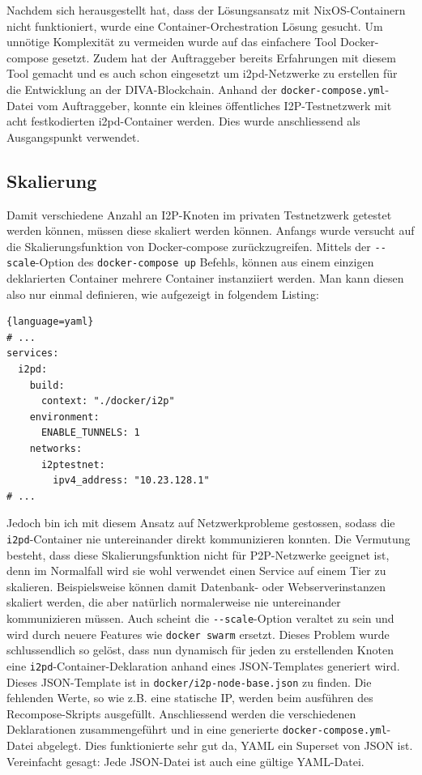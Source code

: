 Nachdem sich herausgestellt hat, dass der Lösungsansatz mit NixOS-Containern nicht funktioniert, wurde eine Container-Orchestration Lösung gesucht.
Um unnötige Komplexität zu vermeiden wurde auf das einfachere Tool Docker-compose gesetzt.
Zudem hat der Auftraggeber bereits Erfahrungen mit diesem Tool gemacht und es auch schon eingesetzt um i2pd-Netzwerke zu erstellen
für die Entwicklung an der DIVA-Blockchain.
Anhand der \lstinline|docker-compose.yml|-Datei vom Auftraggeber,
konnte ein kleines öffentliches I2P-Testnetzwerk mit acht festkodierten i2pd-Container werden.
Dies wurde anschliessend als Ausgangspunkt verwendet.

\subsection{Skalierung}\label{sec:scaling}

Damit verschiedene Anzahl an I2P-Knoten im privaten Testnetzwerk getestet werden können, müssen diese skaliert werden können.
Anfangs wurde versucht auf die Skalierungsfunktion von Docker-compose zurückzugreifen.
Mittels der \lstinline|--scale|-Option des \lstinline|docker-compose up| Befehls, können aus einem einzigen deklarierten Container mehrere Container instanziiert werden. Man kann diesen also nur einmal definieren, wie aufgezeigt in folgendem Listing:
\begin{lstlisting}{language=yaml}
# ... 
services:
  i2pd:
    build:
      context: "./docker/i2p"
    environment:
      ENABLE_TUNNELS: 1
    networks:
      i2ptestnet:
        ipv4_address: "10.23.128.1"
# ...  
\end{lstlisting}

Jedoch bin ich mit diesem Ansatz auf Netzwerkprobleme gestossen,
sodass die \lstinline|i2pd|-Container nie untereinander direkt kommunizieren konnten.
Die Vermutung besteht, dass diese Skalierungsfunktion nicht für P2P-Netzwerke geeignet ist,
denn im Normalfall wird sie wohl verwendet einen Service auf einem Tier zu skalieren.
Beispielsweise können damit Datenbank- oder Webserverinstanzen skaliert werden, die aber natürlich normalerweise nie untereinander kommunizieren müssen.
Auch scheint die \lstinline|--scale|-Option veraltet zu sein und wird durch neuere Features wie \lstinline|docker swarm| ersetzt.
Dieses Problem wurde schlussendlich so gelöst,
dass nun dynamisch für jeden zu erstellenden Knoten eine \lstinline|i2pd|-Container-Deklaration anhand eines JSON-Templates generiert wird.
Dieses JSON-Template ist in \lstinline|docker/i2p-node-base.json| zu finden.
Die fehlenden Werte, so wie z.B. eine statische IP, werden beim ausführen des Recompose-Skripts ausgefüllt.
Anschliessend werden die verschiedenen Deklarationen zusammengeführt und in eine generierte \lstinline|docker-compose.yml|-Datei abgelegt.
Dies funktionierte sehr gut da, YAML ein Superset von JSON ist. Vereinfacht gesagt: Jede JSON-Datei ist auch eine gültige YAML-Datei.

